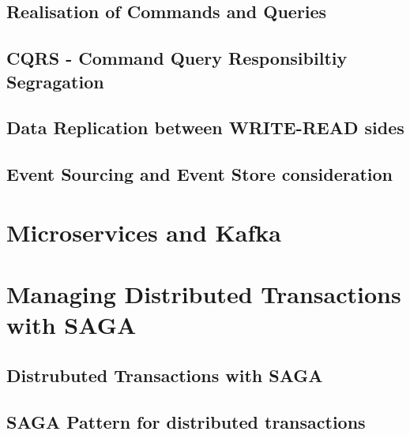 \section{Realisation of Commands and Queries}

\section{CQRS - Command Query Responsibiltiy Segragation}

\section{Data Replication between WRITE-READ sides}

\section{Event Sourcing and Event Store consideration}

\chapter{Microservices and Kafka}



\chapter{Managing Distributed Transactions with SAGA}
\section{Distrubuted Transactions with SAGA}
\section{SAGA Pattern for distributed transactions}
